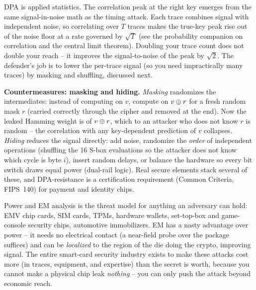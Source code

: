 \begin{connectionbox}
DPA is applied statistics. The correlation peak at the right key emerges from the same signal-in-noise math as the timing attack. Each trace combines signal with independent noise, so correlating over $T$ traces makes the true-key peak rise out of the noise floor at a rate governed by $\sqrt{T}$ (see the probability companion on correlation and the central limit theorem). Doubling your trace count does not double your reach -- it improves the signal-to-noise of the peak by $\sqrt{2}$. The defender's job is to lower the per-trace signal (so you need impractically many traces) by masking and shuffling, discussed next.
\end{connectionbox}


\begin{whybox}
\textbf{Countermeasures: masking and hiding.} \emph{Masking} randomizes the intermediates: instead of computing on $v$, compute on $v \oplus r$ for a fresh random mask $r$ (carried correctly through the cipher and removed at the end). Now the leaked Hamming weight is of $v \oplus r$, which to an attacker who does not know $r$ is random -- the correlation with any key-dependent prediction of $v$ collapses. \emph{Hiding} reduces the signal directly: add noise, randomize the \emph{order} of independent operations (shuffling the 16 S-box evaluations so the attacker does not know which cycle is byte $i$), insert random delays, or balance the hardware so every bit switch draws equal power (dual-rail logic). Real secure elements stack several of these, and DPA-resistance is a certification requirement (Common Criteria, FIPS~140) for payment and identity chips.
\end{whybox}

\begin{applicationbox}
Power and EM analysis is the threat model for anything an adversary can hold: EMV chip cards, SIM cards, TPMs, hardware wallets, set-top-box and game-console security chips, automotive immobilizers. EM has a nasty advantage over power -- it needs no electrical contact (a near-field probe over the package suffices) and can be \emph{localized} to the region of the die doing the crypto, improving signal. The entire smart-card security industry exists to make these attacks cost more (in traces, equipment, and expertise) than the secret is worth, because you cannot make a physical chip leak \emph{nothing} -- you can only push the attack beyond economic reach.
\end{applicationbox}

